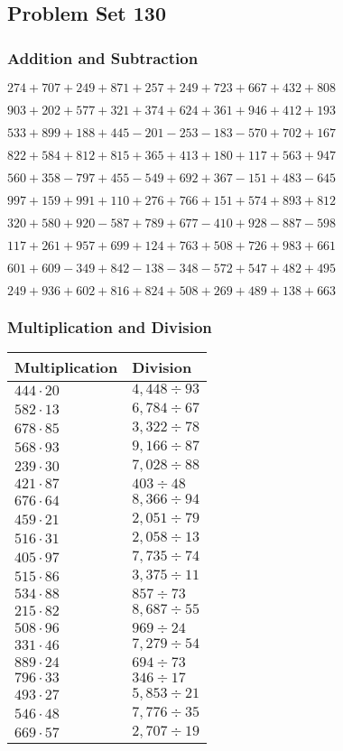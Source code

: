\hypertarget{problem-set-130}{%
\subsection{Problem Set 130}\label{problem-set-130}}

\hypertarget{addition-and-subtraction}{%
\subsubsection{Addition and
Subtraction}\label{addition-and-subtraction}}

\(274 +707 +249 +871 +257 +249 +723 +667 +432 +808\)

\(903 +202 +577 +321 +374 +624 +361 +946 +412 +193\)

\(533 +899 +188 +445 - 201 - 253 - 183 - 570 +702 +167\)

\(822 +584 +812 +815 +365 +413 +180 +117 +563 +947\)

\(560 +358 - 797 +455 - 549 +692 +367 - 151 +483 - 645\)

\(997 +159 +991 +110 +276 +766 +151 +574 +893 +812\)

\(320 +580 +920 - 587 +789 +677 - 410 +928 - 887 - 598\)

\(117 +261 +957 +699 +124 +763 +508 +726 +983 +661\)

\(601 +609 - 349 +842 - 138 - 348 - 572 +547 +482 +495\)

\(249 +936 +602 +816 +824 +508 +269 +489 +138 +663\)

\hypertarget{multiplication-and-division}{%
\subsubsection{Multiplication and
Division}\label{multiplication-and-division}}

\begin{longtable}[]{@{}ll@{}}
\toprule
Multiplication & Division\tabularnewline
\midrule
\endhead
\(444 \cdot 20\) & \(4,448÷93\)\tabularnewline
\(582 \cdot 13\) & \(6,784÷67\)\tabularnewline
\(678 \cdot 85\) & \(3,322÷78\)\tabularnewline
\(568 \cdot 93\) & \(9,166÷87\)\tabularnewline
\(239 \cdot 30\) & \(7,028÷88\)\tabularnewline
\(421 \cdot 87\) & \(403÷48\)\tabularnewline
\(676 \cdot 64\) & \(8,366÷94\)\tabularnewline
\(459 \cdot 21\) & \(2,051÷79\)\tabularnewline
\(516 \cdot 31\) & \(2,058÷13\)\tabularnewline
\(405 \cdot 97\) & \(7,735÷74\)\tabularnewline
\(515 \cdot 86\) & \(3,375÷11\)\tabularnewline
\(534 \cdot 88\) & \(857÷73\)\tabularnewline
\(215 \cdot 82\) & \(8,687÷55\)\tabularnewline
\(508 \cdot 96\) & \(969÷24\)\tabularnewline
\(331 \cdot 46\) & \(7,279÷54\)\tabularnewline
\(889 \cdot 24\) & \(694÷73\)\tabularnewline
\(796 \cdot 33\) & \(346÷17\)\tabularnewline
\(493 \cdot 27\) & \(5,853÷21\)\tabularnewline
\(546 \cdot 48\) & \(7,776÷35\)\tabularnewline
\(669 \cdot 57\) & \(2,707÷19\)\tabularnewline
\bottomrule
\end{longtable}
